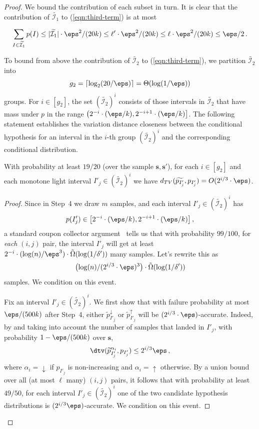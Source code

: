 \begin{proof}
{We bound the contribution of each subset in turn.
It is clear that the contribution of  $\widetilde{\mathcal{I}_1}$
to (\ref{eqn:third-term}) is at most 

$$\sum_{I \in \widetilde{\mathcal{I}_1}} p(I) \le |\widetilde{\mathcal{I}_1}| \cdot \eps^2/(20k) \le   \ell' \cdot \eps^2/(20k) \leq \ell \cdot \eps^2/(20k) \leq \eps/2\,.$$

}

To bound from above the contribution of {$\widetilde{\mathcal{I}_2}$} to (\ref{eqn:third-term}),
we partition {$\widetilde{\mathcal{I}_2}$} into
\[
g_2 = \lceil \log_2 (20/\eps) \rceil =  \Theta (\log(1/\eps))
\]
 groups.
For $i \in [{g_2}]$, the set $(\widetilde{\mathcal{I}_2})^i$
consists of those intervals in  $\widetilde{\mathcal{I}_2}$
that have mass under $p$ in the range
{$\left(  2^{-i} \cdot (\eps/k), 2^{-i+1} \cdot (\eps/k) \right]$}.
{The following statement establishes the variation distance closeness between the conditional hypothesis
for an interval in the $i$-th group $(\widetilde{\mathcal{I}_2})^i$ and the corresponding conditional distribution.}
\begin{claim} \label{claim:not-too-light}
With probability at least $19/20$ (over the sample $\mathbf{s}, \mathbf{s'}$),
for each $i \in [{g_2}]$ and each monotone light interval $I'_j \in {(\widetilde{\mathcal{I}_2})^i}$ we have
$d_{TV}(\widetilde{p_{I'_j}},p_{I'_j}) = O({2^{i/3} \cdot \eps})$.
\end{claim}
\begin{proof} %
Since in Step~4 we draw $m$ samples, and each interval $I'_j \in
{(\widetilde{\mathcal{I}_2})^i}$ has
\[
p(I'_j) \in  { \left[ 2^{-i} \cdot (\eps/k), 2^{-i+1} \cdot (\eps/k)
  \right]}\,,
\]
a standard coupon collector argument~\cite{NS:60} tells us that with probability $99/100$, for \emph{each}
$(i,j)$ pair, the interval $I'_j$ will get at least
${2^{-i} \cdot (\log (n) / \eps^3)} \cdot \tilde{\Omega}( \log(1/\delta'))$ many samples.
Let's rewrite this as
\[
\bigl(\log (n) / (2^{i/3} \cdot \eps)^3\bigr) \cdot \tilde{\Omega}(
\log(1/\delta'))
\]
samples.
We condition on this event.

Fix an interval $I'_j \in {(\widetilde{\mathcal{I}_2})^i}$. We first show that with failure probability
at most  $\eps/(500k)$ after Step~4, either $\widetilde{p}^{\downarrow}_{I'_j}$ or
$\widetilde{p}^{\uparrow}_{I'_j}$ will be {$(2^{i/3} \cdot \eps)$}-accurate.
Indeed, by  and taking into account the number of samples
that landed in $I'_j$, with probability $1-\eps/(500k)$ over $\mathbf{s}$,
\[
\dtv (\widetilde{p}^{\alpha_i}_{I'_j}, p_{I'_j})  \leq {2^{i/3}
  \eps}\,,
\]
where $\alpha_i = \downarrow$ if $p_{I'_j}$ is non-increasing and  $\alpha_i = \uparrow$ otherwise.
By a union bound over all (at most $\ell$ many) $(i,j)$ pairs,
it follows that with probability at least $49/50$, for each interval $I'_j \in {(\widetilde{\mathcal{I}_2})^i}$
one of the two candidate hypothesis distributions is ${(2^{i/3} \eps)}$-accurate. We condition on this event.


\end{proof}
\end{proof}
